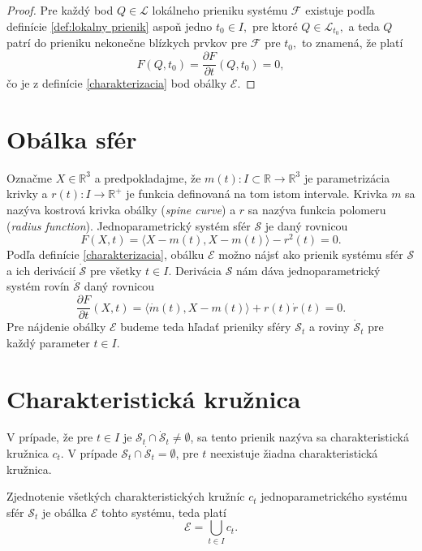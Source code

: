 \begin{proof}
Pre každý bod $Q \in \mathcal{L}$ lokálneho prieniku systému $\mathcal{F}$ existuje podľa definície \ref{def:lokalny prienik} aspoň jedno $t_0 \in I,$ pre ktoré $Q \in \mathcal{L}_{t_0}, $ a teda $Q$ patrí do prieniku nekonečne blízkych prvkov pre $\mathcal{F}$ pre $t_0,$ to znamená, že platí
$$ F(Q, t_0) = \dfrac{\partial F}{\partial t} (Q, t_0) = 0,
$$  
čo je z definície \ref{charakterizacia} bod obálky $\mathcal{E}.$
\end{proof}

\section{Obálka sfér}
Označme $X \in \mathbb{R}^3$ a predpokladajme, že $m(t) \colon I \subset \mathbb{R} \rightarrow \mathbb{R}^3$ je parametrizácia krivky a $r(t) \colon I \rightarrow \mathbb{R}^{+}$ je funkcia definovaná na tom istom intervale. Krivka $m$ sa nazýva kostrová krivka obálky (\textit{spine curve}) a $r$ sa nazýva funkcia polomeru (\textit{radius function}). Jednoparametrický systém sfér $\mathcal{S}$ je daný rovnicou
$$
F(X, t) = \langle X - m(t), X - m(t) \rangle - r^2(t)= 0.
$$
Podľa definície \ref{charakterizacia}, obálku $\mathcal{E}$ možno nájsť ako prienik systému sfér $\mathcal{S}$ a ich derivácií $\mathcal{\dot{S}}$ pre všetky $t \in I$. Derivácia $\mathcal{S}$ nám dáva jednoparametrický systém rovín $\mathcal{\dot{S}}$ daný rovnicou
$$
\dfrac{\partial F}{\partial t} (X, t) = \langle \dot{m}(t), X - m(t) \rangle + r(t) \dot{r}(t) = 0.
$$
Pre nájdenie obálky $\mathcal{E}$ budeme teda hľadať prieniky sféry $\mathcal{S}_t$ a roviny $\mathcal{\dot{S}}_t $ pre každý parameter $t \in I$.

\section{Charakteristická kružnica}
\begin{definition}
V prípade, že pre $t \in I$ je $\mathcal{S}_{t} \cap \mathcal{\dot{S}}_{t} \neq \emptyset$, sa tento prienik nazýva sa charakteristická kružnica $c_{t}$. V prípade $\mathcal{S}_{t} \cap \mathcal{\dot{S}}_{t} = \emptyset$, pre \(t\) neexistuje žiadna charakteristická kružnica.
\end{definition}

\begin{lemma} \label{lema o zjednoteni charakteristickych kruznic}
Zjednotenie všetkých charakteristických kružníc $c_{t}$ jednoparametrického systému sfér $\mathcal{S}_t$ je obálka $\mathcal{E}$ tohto systému, teda platí $$\mathcal{E} = \bigcup_{t \in I} c_{t}.$$
\end{lemma}

